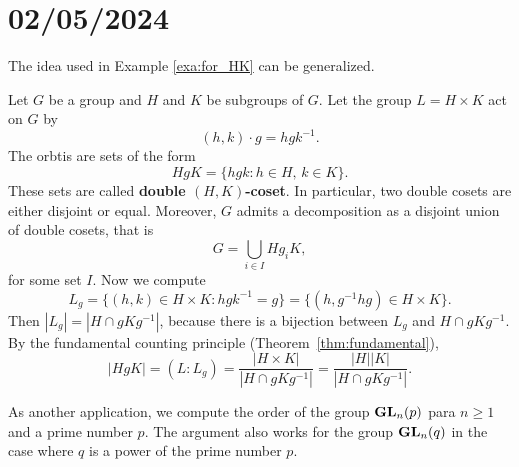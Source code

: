 \section{02/05/2024}


The idea used in Example \ref{exa:for_HK} can be generalized. 

\begin{example}
Let $G$ be a group and $H$ and $K$ be subgroups of $G$. Let the group $L=H\times K$ act on $G$ by
\[
(h,k)\cdot g=hgk^{-1}.
\]
The orbtis are sets of the form 
\[
HgK=\{hgk:h\in H,\,k\in K\}.
\]
These sets are called \textbf{double $(H,K)$-coset}. 
In particular, two double cosets are either disjoint 
or equal. Moreover, $G$ admits a decomposition 
as a disjoint union of double cosets, that is 
\[
G=\bigcup_{i\in I}Hg_iK,
\]
for some set $I$. Now we compute 
\[
L_g=\{(h,k)\in H\times K:hgk^{-1}=g\}=\{(h,g^{-1}hg)\in H\times K\}.
\]
Then $|L_g|=|H\cap gKg^{-1}|$, because there is a bijection between $L_g$ and
$H\cap gKg^{-1}$. By the fundamental counting principle (Theorem~\ref{thm:fundamental}), 
\[
|HgK|=(L:L_g)=\frac{|H\times K|}{|H\cap gKg^{-1}|}=\frac{|H||K|}{|H\cap gKg^{-1}|}.
\]
\end{example}

As another application, we compute the
order of the group $\mathbf{GL}_n(p)$ para $n\geq1$ and 
a prime number $p$. 
The argument also works for
the group $\mathbf{GL}_n(q)$ in the case where
$q$ is a power of the prime number $p$.


